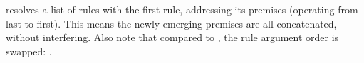 \begin{isabellebody}
\begin{isamarkuptext}
\begin{description}
  \item {} resolves a list of rules with the
  first rule, addressing its premises 
  (operating from last to first).  This means the newly emerging
  premises are all concatenated, without interfering.  Also note that
  compared to , the rule argument order is swapped: .

  \end{description}%
\end{isamarkuptext}%
\isamarkuptrue%
%
\endisatagmlref
{\isafoldmlref}%
%
\isadelimmlref
%
\endisadelimmlref
%
\isadelimtheory
%
\endisadelimtheory
%
\isatagtheory
{}\isamarkupfalse%
%
\endisatagtheory
{\isafoldtheory}%
%
\isadelimtheory
%
\endisadelimtheory
\isanewline
\end{isabellebody}%
